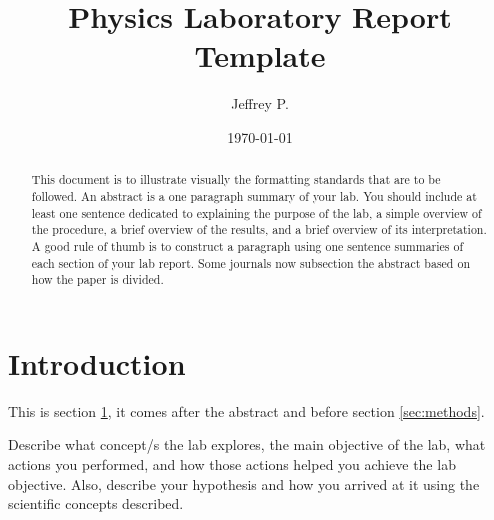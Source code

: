 \documentclass[
    10pt,aps,prl,
    amsfonts,
    amssymb,
    amsmath,
    draft,
    runinaddress,
    secnum,
    showkeys,
    superscriptaddress,
    twocolumn,
]{revtex4}
\begin{document}

\title{Physics Laboratory Report Template}

\author{Jeffrey P. }


\date{\today}

%

\begin{abstract}
    This document is to illustrate visually the formatting standards that
        are to be followed.
    An abstract is a one paragraph summary of your lab.
    You should include at least one sentence dedicated to explaining
        the purpose of the lab, a simple overview of the procedure,
        a brief overview of the results, and a brief overview of
        its interpretation.
    A good rule of thumb is to construct a paragraph using one 
        sentence summaries of each section of your lab report.
    Some journals now subsection the abstract based on how the paper is divided.
\end{abstract}

\maketitle


\section{Introduction}
    \label{sec:intro}

    This is section \ref{sec:intro},
        it comes after the abstract and before section \ref{sec:methods}.

    Describe what concept/s the lab explores, 
        the main objective of the lab, 
        what actions you performed, 
        and how those actions helped you achieve the lab objective.
    Also, describe your hypothesis and how you arrived 
        at it using the scientific concepts described.
\end{document}
